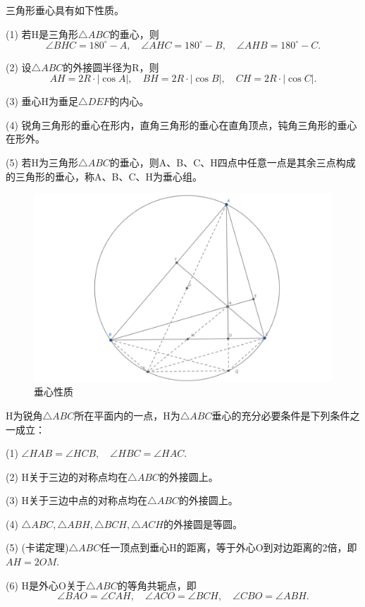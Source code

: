 \begin{proposition}[垂心性质]
    三角形垂心具有如下性质。

    (1) 若H是三角形$\triangle ABC$的垂心，则
    $$\angle BHC = 180^\circ - A,\quad \angle AHC = 180^\circ - B,\quad \angle AHB =180^\circ - C.$$

    (2) 设$\triangle ABC$的外接圆半径为R，则
    $$AH=2R\cdot |\cos A|,\quad
    BH=2R\cdot |\cos B|,\quad
    CH=2R\cdot |\cos C|.$$

    (3) 垂心H为垂足$\triangle DEF$的内心。


    (4) 锐角三角形的垂心在形内，直角三角形的垂心在直角顶点，钝角三角形的垂心在形外。

    (5) 若H为三角形$\triangle ABC$的垂心，则A、B、C、H四点中任意一点是其余三点构成的三角形的垂心，称A、B、C、H为垂心组。
\end{proposition}



\newpage 
\begin{figure}[htbp]
    \centering
    \includegraphics[width=0.7\linewidth]{figures/垂心性质.png}
    \caption{垂心性质}
\end{figure}

\begin{theorem}
    H为锐角$\triangle ABC$所在平面内的一点，H为$\triangle ABC$垂心的充分必要条件是下列条件之一成立：

    (1) $\angle HAB = \angle HCB, \quad \angle HBC = \angle HAC.$
    

    (2) H关于三边的对称点均在$\triangle ABC$的外接圆上。

    (3) H关于三边中点的对称点均在$\triangle ABC$的外接圆上。

    (4) $\triangle ABC,\triangle ABH,\triangle BCH, \triangle ACH$的外接圆是等圆。

    (5) (卡诺定理)$\triangle ABC$任一顶点到垂心H的距离，等于外心O到对边距离的2倍，即$AH = 2OM.$

    (6) H是外心O关于$\triangle ABC$的等角共轭点，即
    $$\angle BAO = \angle CAH, \quad 
    \angle ACO = \angle BCH, \quad 
    \angle CBO = \angle ABH.$$
\end{theorem}

